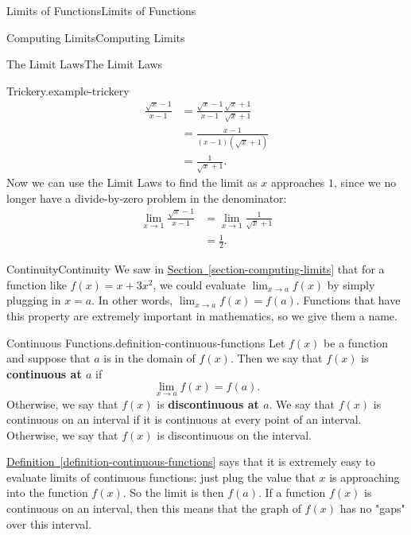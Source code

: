 \documentclass[10pt,]{book}
\newcommand{\terminology}[1]{\textbf{#1}}
\numberwithin{equation}{section}
\begin{document}
\begin{chapterptx}{Limits of Functions}{}{Limits of Functions}{}{}
\begin{sectionptx}{Computing Limits}{}{Computing Limits}{}{}
\begin{subsectionptx}{The Limit Laws}{}{The Limit Laws}{}{}
\begin{example}{Trickery.}{example-trickery}
%
\begin{align*}
\frac{\sqrt{x}-1}{x-1} & = \frac{\sqrt{x}-1}{x-1}\frac{\sqrt{x}+1}{\sqrt{x}+1} \\
& = \frac{x - 1}{(x-1)(\sqrt{x}+1)} \\
& = \frac{1}{\sqrt{x}+1}. 
\end{align*}
\hypertarget{p-30}{}%
Now we can use the Limit Laws to find the limit as \(x\) approaches \(1\), since we no longer have a divide-by-zero problem in the denominator:%
%
\begin{align*}
\lim_{x\to1}\frac{\sqrt{x}-1}{x-1} & = \lim_{x\to1}\frac{1}{\sqrt{x}+1} \\
& = \frac{1}{2}. 
\end{align*}
\end{example}
\end{subsectionptx}
\end{sectionptx}
%
%
\typeout{************************************************}
\typeout{************************************************}
%
\begin{sectionptx}{Continuity}{}{Continuity}{}{}\label{section-continuity}
\hypertarget{p-31}{}%
We saw in \hyperref[section-computing-limits]{Section~\ref{section-computing-limits}} that for a function like \(f(x) = x+3x^{2}\), we could evaluate \(\lim_{x\to a}f(x)\) by simply plugging in \(x=a\). In other words, \(\lim_{x\to a}f(x) = f(a)\). Functions that have this property are extremely important in mathematics, so we give them a name.%
\begin{definition}{Continuous Functions.}{definition-continuous-functions}%
\hypertarget{p-32}{}%
Let \(f(x)\) be a function and suppose that \(a\) is in the domain of \(f(x)\). Then we say that \(f(x)\) is \terminology{continuous at \(a\)} if%
\begin{equation*}
\lim_{x\to a}f(x) = f(a)\text{.}
\end{equation*}
Otherwise, we say that \(f(x)\) is \terminology{discontinuous at \(a\)}. We say that \(f(x)\) is continuous on an interval if it is continuous at every point of an interval. Otherwise, we say that \(f(x)\) is discontinuous on the interval.%
\end{definition}
\hypertarget{p-33}{}%
\hyperref[definition-continuous-functions]{Definition~\ref{definition-continuous-functions}} says that it is extremely easy to evaluate limits of continuous functions: just plug the value that \(x\) is approaching into the function \(f(x)\). So the limit is then \(f(a)\). If a function \(f(x)\) is continuous on an interval, then this means that the graph of \(f(x)\) has no "gaps" over this interval.%

\end{sectionptx}
\end{chapterptx}
\end{document}

